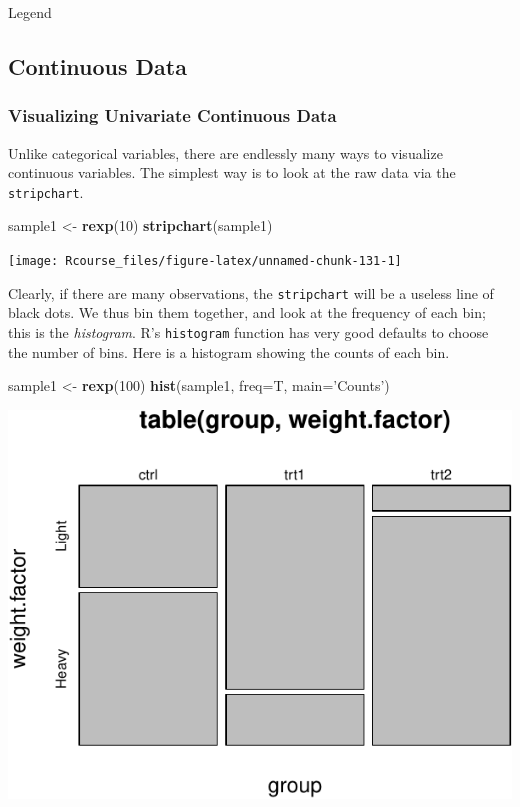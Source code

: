 \documentclass[]{book}
\newenvironment{Shaded}{\begin{snugshade}}{\end{snugshade}}
\newcommand{\DataTypeTok}[1]{\textcolor[rgb]{0.13,0.29,0.53}{#1}}
\newcommand{\DecValTok}[1]{\textcolor[rgb]{0.00,0.00,0.81}{#1}}
\newcommand{\KeywordTok}[1]{\textcolor[rgb]{0.13,0.29,0.53}{\textbf{#1}}}
\newcommand{\NormalTok}[1]{#1}
\newcommand{\StringTok}[1]{\textcolor[rgb]{0.31,0.60,0.02}{#1}}
\theoremstyle{definition}
\theoremstyle{definition}
\theoremstyle{definition}
\theoremstyle{remark}
\begin{document}
\hypertarget{htmlwidget-6d265d5f7c1d4c75e34c}{}
Legend

\hypertarget{continuous-data}{%
\subsection{Continuous Data}\label{continuous-data}}

\hypertarget{visualizing-univariate-continuous-data}{%
\subsubsection{Visualizing Univariate Continuous Data}\label{visualizing-univariate-continuous-data}}

Unlike categorical variables, there are endlessly many ways to visualize continuous variables.
The simplest way is to look at the raw data via the \texttt{stripchart}.

\begin{Shaded}
\begin{Highlighting}[]
\NormalTok{sample1 <-}\StringTok{ }\KeywordTok{rexp}\NormalTok{(}\DecValTok{10}\NormalTok{)                             }
\KeywordTok{stripchart}\NormalTok{(sample1)}
\end{Highlighting}
\end{Shaded}

\texttt{[image: Rcourse\_files/figure-latex/unnamed-chunk-131-1]}

Clearly, if there are many observations, the \texttt{stripchart} will be a useless line of black dots.
We thus bin them together, and look at the frequency of each bin; this is the \emph{histogram}.
R's \texttt{histogram} function has very good defaults to choose the number of bins.
Here is a histogram showing the counts of each bin.

\begin{Shaded}
\begin{Highlighting}[]
\NormalTok{sample1 <-}\StringTok{ }\KeywordTok{rexp}\NormalTok{(}\DecValTok{100}\NormalTok{)                            }
\KeywordTok{hist}\NormalTok{(sample1, }\DataTypeTok{freq=}\NormalTok{T, }\DataTypeTok{main=}\StringTok{'Counts'}\NormalTok{)        }
\end{Highlighting}
\end{Shaded}

\includegraphics[width=0.5\linewidth]{Rcourse_files/figure-latex/unnamed-chunk-132-1}
\end{document}

